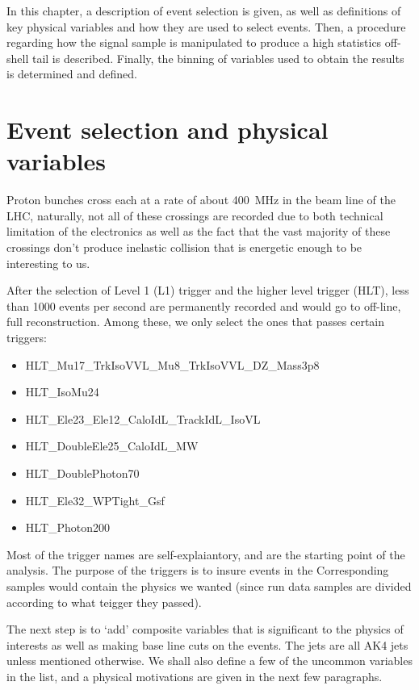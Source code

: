 In this chapter, a description of event selection is given, as well as definitions of
key physical variables and how they are used to select events. Then, a procedure regarding
how the signal sample is manipulated to produce a high statistics off-shell tail is described.
Finally, the binning of variables used to obtain the results is determined and defined.

\section{Event selection and physical variables}
Proton bunches cross each at a rate of about \SI{400}{\mega\hertz} in the beam line of
the LHC, naturally, not all of these crossings are recorded due to both technical
limitation of the electronics as well as the fact that the vast majority of these
crossings don't produce inelastic collision that is energetic enough to be interesting to us.

After the selection of Level 1 (L1) trigger and the higher level trigger (HLT), less than 1000
events per second are permanently recorded and would go to off-line, full reconstruction. Among these,
we only select the ones that passes certain triggers:
\begin{itemize}
    \item HLT\_Mu17\_TrkIsoVVL\_Mu8\_TrkIsoVVL\_DZ\_Mass3p8
    \item HLT\_IsoMu24
    \item HLT\_Ele23\_Ele12\_CaloIdL\_TrackIdL\_IsoVL
    \item HLT\_DoubleEle25\_CaloIdL\_MW
    \item HLT\_DoublePhoton70
    \item HLT\_Ele32\_WPTight\_Gsf
    \item HLT\_Photon200
\end{itemize}
Most of the trigger names are self-explaiantory, and are the starting point of the analysis. The
purpose of the triggers is to insure events in the Corresponding samples would contain the physics
we wanted (since run data samples are divided according to what teigger they passed).

The next step is to `add' composite variables that is significant to the physics of interests as
well as making base line cuts on the events.
The jets are all AK4 jets unless mentioned otherwise. We shall also define a few of the
uncommon variables in the list, and a physical motivations are given in the next few
paragraphs.

